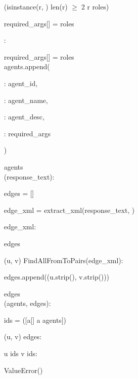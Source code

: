 \begin{subagent}[title=High DoM Parser]
\quad\quad\quad\quad {} (isinstance(r, )  len(r) $\geq$ 2  r  roles)

\quad\quad\quad\quad required\_args[] = roles

\quad\quad\quad {}:

\quad\quad\quad\quad required\_args[] = roles \\

\quad\quad agents.append(\code{\{}

\quad\quad\quad {}: agent\_id,

\quad\quad\quad {}: agent\_name,

\quad\quad\quad {}: agent\_desc,

\quad\quad\quad {}: required\_args

\quad\quad \code{\}})

\quad {} agents \\



 (response\_text):

\quad edges = []

\quad edge\_xml = extract\_xml(response\_text, )

\quad {}  edge\_xml:

\quad\quad {} edges \\

\quad {}

\quad {} (u, v)  FindAllFromToPairs(edge\_xml):

\quad\quad edges.append((u.strip(), v.strip()))

\quad {} edges \\



 (agents, edges):

\quad {}

\quad ids = ([a[]  a  agents])

\quad {} (u, v)  edges:

\quad\quad {} u  ids  v  ids:

\quad\quad\quad {} ValueError() \\



\end{subagent}
